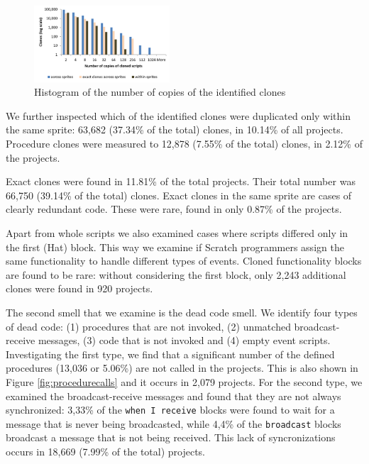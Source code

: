 \documentclass{sig-alternate}
\begin{document}
\begin{figure}
	\centering
	\includegraphics[width=0.45\textwidth]{fig/charts/11clonescopies}
	\caption{Histogram of the number of copies of the identified clones}
	\label{fig:clonescopies}
\end{figure}

We further inspected which of the identified clones were duplicated only within the same sprite: 63,682 (37.34\% of the total) clones, in 10.14\% of all projects. Procedure clones were measured to 12,878 (7.55\% of the total) clones, in 2.12\% of the projects.

Exact clones were found in 11.81\% of the total projects. Their total number was 66,750 (39.14\% of the total) clones. Exact clones in the same sprite are cases of clearly redundant code. These were rare, found in only 0.87\% of the projects.

Apart from whole scripts we also examined cases where scripts differed only in the first (Hat) block. This way we examine if Scratch programmers assign the same functionality to handle different types of events. Cloned functionality blocks are found to be rare: without considering the first block, only 2,243 additional clones were found in 920 projects.

The second smell that we examine is the dead code smell. We identify four types of dead code: (1) procedures that are not invoked, (2) unmatched broadcast-receive messages, (3) code that is not invoked and (4) empty event scripts. Investigating the first type, we find that a significant number of the defined procedures (13,036 or 5.06\%) are not called in the projects. This is also shown in Figure \ref{fig:procedurecalls} and it occurs in 2,079 projects. For the second type, we examined the broadcast-receive messages and found that they are not always synchronized: 3,33\% of the \texttt{when I receive} blocks were found to wait for a message that is never being broadcasted, while 4,4\% of the \texttt{broadcast} blocks broadcast a message that is not being received. This lack of syncronizations occurs in 18,669 (7.99\% of the total) projects.
\end{document}
